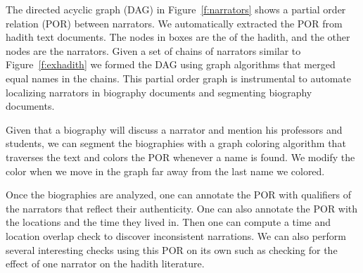 \documentclass[12pt]{article}
\begin{document}
\begin{figure}[tb]
\end{figure}

The directed acyclic graph (DAG) 
in Figure~\ref{f:narrators} shows a partial order relation (POR) between
narrators.
We automatically extracted the POR from hadith text 
documents.
The nodes in boxes are the  of the hadith, 
and the other nodes are the narrators.
Given a set of chains of narrators similar to 
Figure~\ref{f:exhadith} we formed the DAG using graph algorithms 
that merged equal names in the chains. 
This partial order graph is instrumental to automate
localizing narrators in biography documents and
segmenting biography documents.

Given that a biography will discuss a narrator and mention
his professors and students,
we can segment the biographies with a graph coloring algorithm 
that traverses the text and colors the POR whenever
a name is found. 
We modify the color when we move in the graph 
far away from the last name we colored.

Once the biographies are analyzed, one can annotate
the POR with qualifiers of the narrators that reflect
their authenticity. 
One can also annotate the POR with the locations and 
the time they lived in. 
Then one can compute a time and location overlap
check to discover inconsistent narrations.
We can also perform several interesting checks using 
this POR on its own such as checking for the effect of
one narrator on the hadith literature. 
\end{document}

